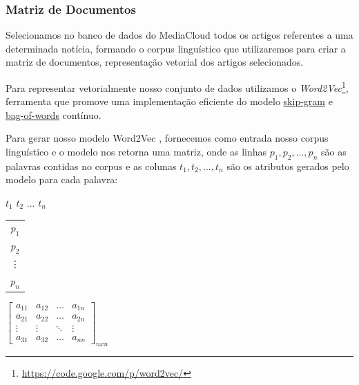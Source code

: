 \documentclass[a4paper,12pt]{article}
\begin{document}
\pagebreak
\subsubsection{Matriz de Documentos}

Selecionamos no banco de dados do MediaCloud todos os artigos referentes a uma determinada notícia, formando o corpus linguístico que 
utilizaremos para criar a matriz de documentos, representação vetorial dos artigos selecionados.

Para representar vetorialmente nosso conjunto de dados utilizamos o \textit{Word2Vec}\footnote[1]{\url{https://code.google.com/p/word2vec/}}, ferramenta que promove uma implementação 
eficiente do modelo \hyperref[sec:nlp]{skip-gram} e \hyperref[sec:nlp]{bag-of-words} contínuo.

Para gerar nosso modelo Word2Vec , fornecemos como entrada nosso corpus linguístico
e o modelo nos retorna uma matriz, onde as linhas $p_{1},p_{2},...,p_{n}$ são as palavras contidas no corpus e as colunas $t_{1},t_{2},...,t_{n}$
são os atributos gerados pelo modelo para cada palavra:
 
 \begin{center}
 \hspace{0.2cm}$t_{1}$ \hspace{0.5cm} $t_{2}$ \hspace{0.3cm} $\hdots$ \hspace{0.4cm}$t_{n}$
 
 \vspace{0.2cm}
 
\begin{tabular}{c}
   $p_{1}$ \\
   $p_{2}$ \\
   \vdots\\
   $p_{n}$
 \end{tabular}
 $
 \begin{bmatrix}
  a_{11} & a_{12} & \hdots & a_{1n}\\
  a_{21} & a_{22} & \hdots & a_{2n}\\
  \vdots & \vdots & \ddots & \vdots\\
  a_{31} & a_{32} & \hdots & a_{nn}
 \end{bmatrix}_{nxn}
$

\end{center}
\end{document}
